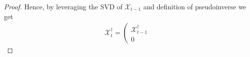\documentclass[journal]{IEEEtran}
\theoremstyle{definition}
\theoremstyle{remark}
\begin{document}
\begin{proof}
	Hence, by leveraging the SVD of $\mathcal{X}_{t-1}$ and definition of pseudoinverse we get
	\begin{gather*}
	    \mathcal{X}_t^{\dagger} = \left(\begin{array}{c}
			\mathcal{X}_{t-1}^\dagger \\ 0

\end{array}
\end{gather*}
\end{proof}
\end{document}

